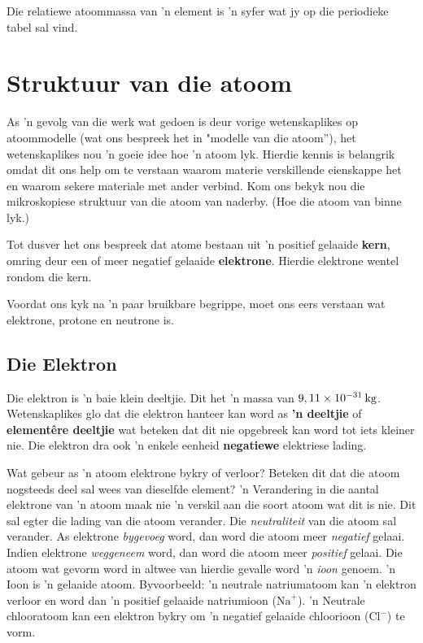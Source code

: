 Die relatiewe atoommassa van 'n element is 'n syfer wat jy op die periodieke tabel sal vind. 

\section{Struktuur van die atoom}
\nopagebreak
\label{m38745*id255206}
As 'n gevolg van die werk wat gedoen is deur vorige wetenskaplikes op atoommodelle (wat ons bespreek het in "modelle van die atoom”), het wetenskaplikes nou 'n goeie idee hoe 'n atoom lyk. Hierdie kennis is belangrik omdat dit ons help om te verstaan ​waarom materie verskillende eienskappe het en waarom sekere materiale met ander verbind. Kom ons bekyk nou die mikroskopiese struktuur van die atoom van naderby. (Hoe die atoom van binne lyk.) \par 


Tot dusver het ons bespreek dat atome bestaan uit 'n positief gelaaide \textbf{kern}, omring deur een of meer negatief gelaaide \textbf{elektrone}. Hierdie elektrone wentel rondom die kern. \par 
      
Voordat ons kyk na 'n paar bruikbare begrippe, moet ons eers verstaan wat elektrone, protone en neutrone is.\par
 
\subsection*{Die Elektron}
\nopagebreak
\label{m38745*id255241}
Die elektron is 'n baie klein deeltjie. Dit het 'n massa van $9,11\ensuremath{\times}{10}^{-31}\phantom{\rule{2pt}{0ex}}\text{kg}$. Wetenskaplikes glo dat die elektron hanteer kan word as \textbf{ 'n deeltjie} of \textbf{element\^{e}re deeltjie} wat beteken dat dit nie opgebreek kan word tot iets kleiner nie. Die elektron dra ook 'n enkele eenheid \textbf{negatiewe} elektriese lading.\par 
\label{m38745*eip-222}
Wat gebeur as 'n atoom elektrone bykry of verloor? Beteken dit dat die atoom nogsteeds deel sal wees van dieselfde element? 'n Verandering in die aantal elektrone van 'n atoom maak nie  'n verskil aan die soort atoom wat dit is nie. Dit sal egter die lading van die atoom verander. Die \textsl{neutraliteit} van die atoom sal verander. As elektrone \textsl{bygevoeg} word, dan word die atoom meer \textsl{negatief} gelaai. Indien elektrone \textsl{weggeneem} word, dan word die atoom meer \textsl{positief} gelaai. Die atoom wat gevorm word in altwee van hierdie gevalle word 'n \textsl{ioon} genoem. 'n Ioon is 'n gelaaide atoom. Byvoorbeeld: 'n neutrale natriumatoom kan 'n elektron verloor en word dan 'n positief gelaaide natriumioon ($\text{Na}^{+}$). 'n Neutrale chlooratoom kan een elektron bykry om 'n negatief gelaaide chloorioon ($\text{Cl}^{-}$) te vorm.
      
